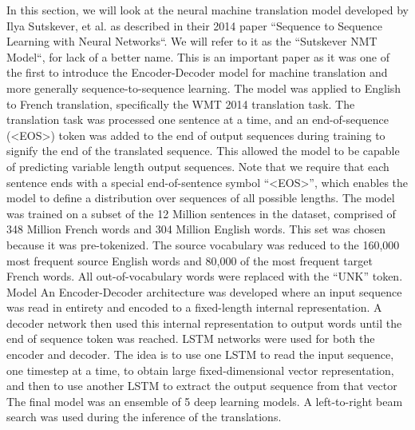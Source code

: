 In this section, we will look at the neural machine translation model developed by Ilya Sutskever, et al. as described in their 2014 paper “Sequence to Sequence Learning with Neural Networks“. We will refer to it as the “Sutskever NMT Model“, for lack of a better name.
This is an important paper as it was one of the first to introduce the Encoder-Decoder model for machine translation and more generally sequence-to-sequence learning.
The model was applied to English to French translation, specifically the WMT 2014 translation task.
The translation task was processed one sentence at a time, and an end-of-sequence (<EOS>) token was added to the end of output sequences during training to signify the end of the translated sequence. This allowed the model to be capable of predicting variable length output sequences.
    Note that we require that each sentence ends with a special end-of-sentence symbol “<EOS>”, which enables the model to define a distribution over sequences of all possible lengths.
The model was trained on a subset of the 12 Million sentences in the dataset, comprised of 348 Million French words and 304 Million English words. This set was chosen because it was pre-tokenized.
The source vocabulary was reduced to the 160,000 most frequent source English words and 80,000 of the most frequent target French words. All out-of-vocabulary words were replaced with the “UNK” token.
Model
An Encoder-Decoder architecture was developed where an input sequence was read in entirety and encoded to a fixed-length internal representation.
A decoder network then used this internal representation to output words until the end of sequence token was reached. LSTM networks were used for both the encoder and decoder.
    The idea is to use one LSTM to read the input sequence, one timestep at a time, to obtain large fixed-dimensional vector representation, and then to use another LSTM to extract the output sequence from that vector
The final model was an ensemble of 5 deep learning models. A left-to-right beam search was used during the inference of the translations.


